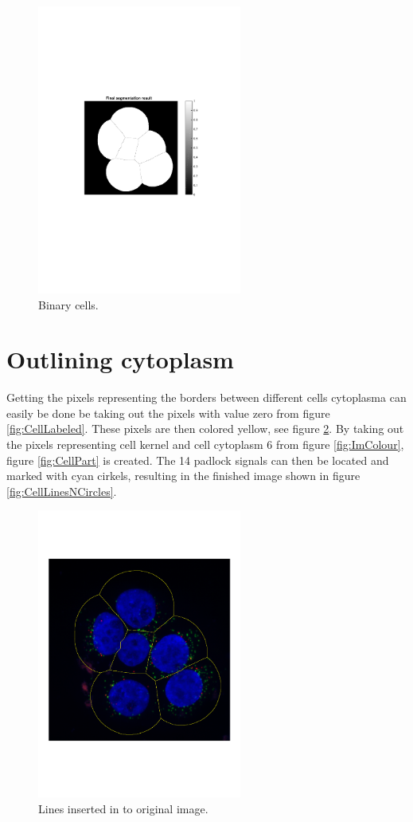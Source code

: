 \documentclass[10pt,twocolumn]{article}
\begin{document}
\begin{figure}[ht]
\centering
\includegraphics[width=0.6\textwidth]{Bilder/CellBw.pdf}
\caption{Binary cells.}
\label{fig:CellBw}
\end{figure}

\section{Outlining cytoplasm}
Getting the pixels representing the borders between different cells cytoplasma can
easily be done be taking out the pixels with value zero from figure \ref{fig:CellLabeled}.
These pixels are then colored yellow, see figure \ref{fig:CellLines}.
By taking out the pixels representing cell kernel and cell cytoplasm 6 from figure
\ref{fig:ImColour}, figure \ref{fig:CellPart} is created. The 14 padlock signals can then be located and marked with cyan cirkels, resulting in the finished image shown in figure \ref{fig:CellLinesNCircles}.

\begin{figure}[ht]
\centering
\includegraphics[width=0.6\textwidth]{Bilder/CellLines.pdf}
\caption{Lines inserted in to original image.}
\label{fig:CellLines}
\end{figure}
\end{document}
